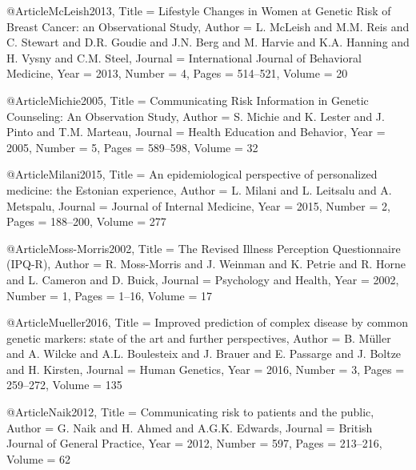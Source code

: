 @Article{McLeish2013,
  Title                    = {Lifestyle Changes in Women at Genetic Risk of Breast Cancer: an Observational Study},
  Author                   = {L. McLeish and M.M. Reis and C. Stewart and D.R. Goudie and J.N. Berg and M. Harvie and K.A. Hanning and H. Vysny and C.M. Steel},
  Journal                  = {International Journal of Behavioral Medicine},
  Year                     = {2013},
  Number                   = {4},
  Pages                    = {514--521},
  Volume                   = {20}
}

@Article{Michie2005,
  Title                    = {Communicating Risk Information in Genetic Counseling: An Observation Study},
  Author                   = {S. Michie and K. Lester and J. Pinto and T.M. Marteau},
  Journal                  = {Health Education and Behavior},
  Year                     = {2005},
  Number                   = {5},
  Pages                    = {589--598},
  Volume                   = {32}
}

@Article{Milani2015,
  Title                    = {An epidemiological perspective of personalized medicine: the Estonian experience},
  Author                   = {L. Milani and L. Leitsalu and A. Metspalu},
  Journal                  = {Journal of Internal Medicine},
  Year                     = {2015},
  Number                   = {2},
  Pages                    = {188--200},
  Volume                   = {277}
}

@Article{Moss-Morris2002,
  Title                    = {The Revised Illness Perception Questionnaire (IPQ-R)},
  Author                   = {R. Moss-Morris and J. Weinman and K. Petrie and R. Horne and L. Cameron and D. Buick},
  Journal                  = {Psychology and Health},
  Year                     = {2002},
  Number                   = {1},
  Pages                    = {1--16},
  Volume                   = {17}
}

@Article{Mueller2016,
  Title                    = {Improved prediction of complex disease by common genetic markers: state of the art and further perspectives},
  Author                   = {B. Müller and A. Wilcke and A.L. Boulesteix and J. Brauer and E. Passarge and J. Boltze and H. Kirsten},
  Journal                  = {Human Genetics},
  Year                     = {2016},
  Number                   = {3},
  Pages                    = {259--272},
  Volume                   = {135}
}

@Article{Naik2012,
  Title                    = {Communicating risk to patients and the public},
  Author                   = {G. Naik and H. Ahmed and A.G.K. Edwards},
  Journal                  = {British Journal of General Practice},
  Year                     = {2012},
  Number                   = {597},
  Pages                    = {213--216},
  Volume                   = {62}
}

